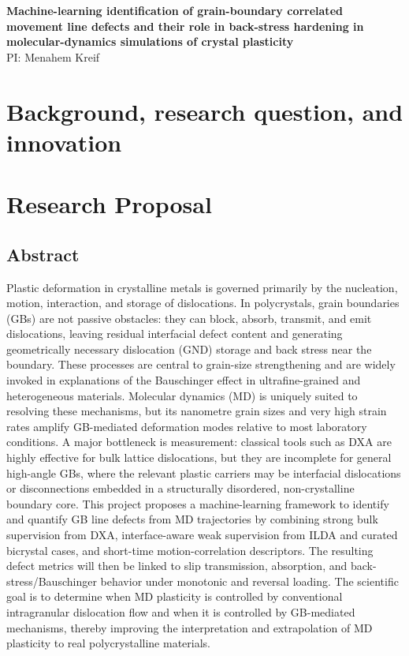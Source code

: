 \documentclass[11pt]{article}
\begin{document}
\begin{center}
{\Large \textbf{Machine-learning identification of grain-boundary correlated movement line defects and their role in back-stress hardening in molecular-dynamics simulations of crystal plasticity}}\\
\vspace{0.3em}
{\normalsize PI: Menahem Kreif}\\
\vspace{0.3em}
\end{center}

\section*{Background, research question, and innovation}

\section*{Research Proposal}

\subsection*{Abstract}
Plastic deformation in crystalline metals is governed primarily by the nucleation, motion, interaction, and storage of dislocations. In polycrystals, grain boundaries (GBs) are not passive obstacles: they can block, absorb, transmit, and emit dislocations, leaving residual interfacial defect content and generating geometrically necessary dislocation (GND) storage and back stress near the boundary. These processes are central to grain-size strengthening and are widely invoked in explanations of the Bauschinger effect in ultrafine-grained and heterogeneous materials. Molecular dynamics (MD) is uniquely suited to resolving these mechanisms, but its nanometre grain sizes and very high strain rates amplify GB-mediated deformation modes relative to most laboratory conditions. A major bottleneck is measurement: classical tools such as DXA are highly effective for bulk lattice dislocations, but they are incomplete for general high-angle GBs, where the relevant plastic carriers may be interfacial dislocations or disconnections embedded in a structurally disordered, non-crystalline boundary core. This project proposes a machine-learning framework to identify and quantify GB line defects from MD trajectories by combining strong bulk supervision from DXA, interface-aware weak supervision from ILDA and curated bicrystal cases, and short-time motion-correlation descriptors. The resulting defect metrics will then be linked to slip transmission, absorption, and back-stress/Bauschinger behavior under monotonic and reversal loading. The scientific goal is to determine when MD plasticity is controlled by conventional intragranular dislocation flow and when it is controlled by GB-mediated mechanisms, thereby improving the interpretation and extrapolation of MD plasticity to real polycrystalline materials.
\end{document}
